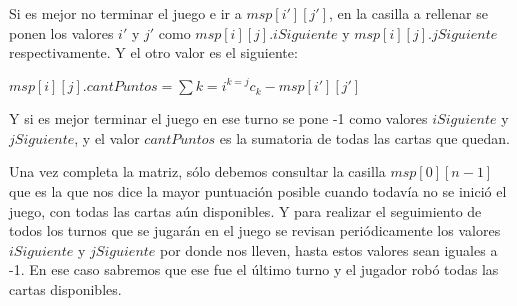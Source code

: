 Si es mejor no terminar el juego e ir a $msp[i'][j']$,  en la casilla a rellenar se ponen los valores $i'$ y $j'$ como $msp[i][j].iSiguiente$ y $msp[i][j].jSiguiente$ respectivamente. Y el otro valor es el siguiente:

$msp[i][j].cantPuntos = \sum{k=i}^{k=j} c_k - msp[i'][j']$

Y si es mejor terminar el juego en ese turno se pone -1 como valores $iSiguiente$ y $jSiguiente$, y el valor $cantPuntos$ es la sumatoria de todas las cartas que quedan.

Una vez completa la matriz, sólo debemos consultar la casilla $msp[0][n-1]$ que es la que nos dice la mayor puntuación posible cuando todavía no se inició el juego, con todas las cartas aún disponibles. Y para realizar el seguimiento de todos los turnos que se jugarán en el juego se revisan periódicamente los valores $iSiguiente$ y $jSiguiente$ por donde nos lleven, hasta estos valores sean iguales a -1. En ese caso sabremos que ese fue el último turno y el jugador robó todas las cartas disponibles.